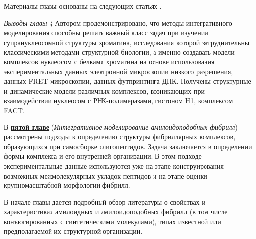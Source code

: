 Материалы главы основаны на следующих статьях \cite{xiao_molecular_2017,gaykalova_structural_2015,valieva_large-scale_2016,gorkovets_joint_2018,bass_effect_2019,armeev_modeling_2016}.



\textit{Выводы главы 4} \newline
Автором продемонстрировано, что методы интегративного моделирования способны решать важный класс задач при изучении супрануклеосомной структуры хроматина, исследования которой затруднительны классическими методами структурной биологии, а именно создавать модели комплексов нуклеосом с белками хроматина на основе использования экспериментальных данных электронной микроскопии низкого разрешения, данных FRET-микроскопии, данных футпринтинга ДНК. Получены структурные и динамические модели различных комплексов, возникающих при взаимодействии нуклеосом с РНК-полимеразами, гистоном H1, комплексом FACT.





В \underline{\textbf{пятой главе}} (\textit{Интегративное моделирование амилоидоподобных фибрилл}) рассмотрены подходы к определению структуры фибриллярных комплексов, образующихся при самосборке олигопептидов. Задача заключается в определении формы комплекса и его внутренней организации.
В этом подходе экспериментальные данные используются уже на этапе конструирования возможных межмолекулярных укладок пептидов и на этапе оценки крупномасштабной морфологии фибрилл.

В начале главы дается подробный обзор литературы о свойствах и характеристиках амилоидных и амилоидоподобных фибрилл (в том числе конъюгированных с синтетическими молекулами), типах известной или предполагаемой их структурной организации. 

